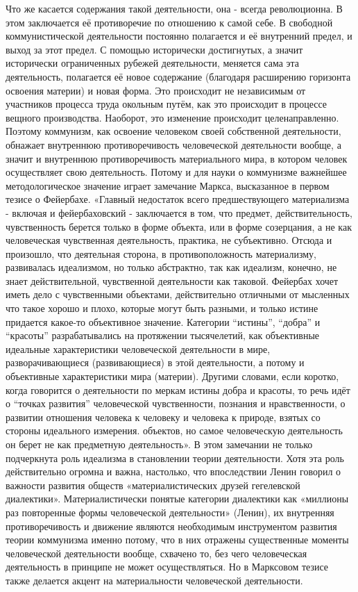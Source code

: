 \documentclass[../main]{subfiles}
\begin{document}
Что же касается содержания такой деятельности, она - всегда революционна. В этом заключается её противоречие по отношению к самой себе. В свободной коммунистической деятельности постоянно полагается и её внутренний предел, и выход за этот предел. С помощью исторически достигнутых, а значит исторически ограниченных рубежей деятельности, меняется сама эта деятельность, полагается её новое содержание (благодаря расширению горизонта освоения материи) и новая форма. Это происходит не независимым от участников процесса труда окольным путём, как это происходит в процессе вещного производства. Наоборот, это изменение происходит целенаправленно. Поэтому коммунизм, как освоение человеком своей собственной деятельности, обнажает внутреннюю противоречивость человеческой деятельности вообще, а значит и внутреннюю противоречивость материального мира, в котором человек осуществляет свою деятельность. Потому и для науки о коммунизме важнейшее методологическое значение играет замечание Маркса, высказанное в первом тезисе о Фейербахе. «Главный недостаток всего предшествующего материализма - включая и фейербаховский - заключается в том, что предмет, действительность, чувственность берется только в форме объекта, или в форме созерцания, а не как человеческая чувственная деятельность, практика, не субъективно. Отсюда и произошло, что деятельная сторона, в противоположность материализму, развивалась идеализмом, но только абстрактно, так как идеализм, конечно, не знает действительной, чувственной деятельности как таковой. Фейербах хочет иметь дело с чувственными объектами, действительно отличными от мысленных что такое хорошо и плохо, которые могут быть разными, и только истине придается какое-то объективное значение. Категории “истины”, “добра” и “красоты” разрабатывались на протяжении тысячелетий, как объективные идеальные характеристики человеческой деятельности в мире, разворачивающиеся (развивающиеся) в этой деятельности, а потому и объективные характеристики мира (материи). Другими словами, если коротко, когда говорится о деятельности по меркам истины добра и красоты, то речь идёт о “точках развития” человеческой чувственности, познания и нравственности, о развитии отношения человека к человеку и человека к природе, взятых со стороны идеального измерения. объектов, но самое человеческую деятельность он берет не как предметную деятельность». В этом замечании не только подчеркнута роль идеализма в становлении теории деятельности. Хотя эта роль действительно огромна и важна, настолько, что впоследствии Ленин говорил о важности развития обществ «материалистических друзей гегелевской диалектики». Материалистически понятые категории диалектики как «миллионы раз повторенные формы человеческой деятельности» (Ленин), их внутренняя противоречивость и движение являются необходимым инструментом развития теории коммунизма именно потому, что в них отражены существенные моменты человеческой деятельности вообще, схвачено то, без чего человеческая деятельность в принципе не может осуществляться. Но в Марксовом тезисе также делается акцент на материальности человеческой деятельности.
\end{document}
